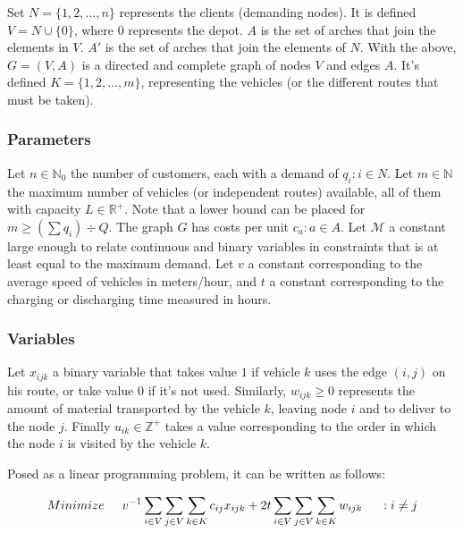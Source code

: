 \documentclass{amsart}
\begin{document}
        
        Set $N=\{1, 2, ... , n\}$ represents the clients (demanding nodes). It is defined $V=N \cup \{0\}$, where $0$ represents the depot. $A$ is the set of arches that join the elements in $V$. $A'$ is the set of arches that join the elements of $N$. With the above, $G=(V, A)$ is a directed and complete graph of nodes $V$ and edges $A$. It's defined $K = \{1, 2, ..., m\}$, representing the vehicles (or the different routes that must be taken).
        

        \subsubsection{Parameters}
        
        
        Let $n \in \mathbb{N}_0$ the number of customers, each with a demand of $q_i : i \in N$. Let $m \in \mathbb{N}$ the maximum number of vehicles (or independent routes) available, all of them with capacity $L \in \mathbb{R}^+$. Note that a lower bound can be placed for $m \geq (\sum q_i) \div Q$. The graph $G$ has costs per unit $c_{a} : a \in A$. Let $\mathcal{M}$ a constant large enough to relate continuous and binary variables in constraints that is at least equal to the maximum demand. Let $v$ a constant corresponding to the average speed of vehicles in meters/hour, and $t$ a constant corresponding to the charging or discharging time measured in hours.


        \subsubsection{Variables}
        
        
        Let $x_{ijk}$ a binary variable that takes value $1$ if vehicle $k$ uses the edge $(i, j)$ on his route, or take value $0$ if it's not used. Similarly, $w_{ijk} \geq 0$ represents the amount of material transported by the vehicle $k$, leaving node $i$ and to deliver to the node $j$. Finally $u_{ik} \in \mathbb{Z}^+$ takes a value corresponding to the order in which the node $i$ is visited by the vehicle $k$.

        
        \vspace{0.4cm} Posed as a linear programming problem, it can be written as follows:
            
            \begin{equation}
                Minimize \hspace{0.5cm} v^{-1} \sum_{i \in V} \sum_{j \in V} \sum_{k \in K} c_{ij} x_{ijk} + 2t \sum_{i \in V} \sum_{j \in V} \sum_{k \in K} w_{ijk} \hspace{0.5cm} : i \neq j
            \end{equation}
\end{document}
